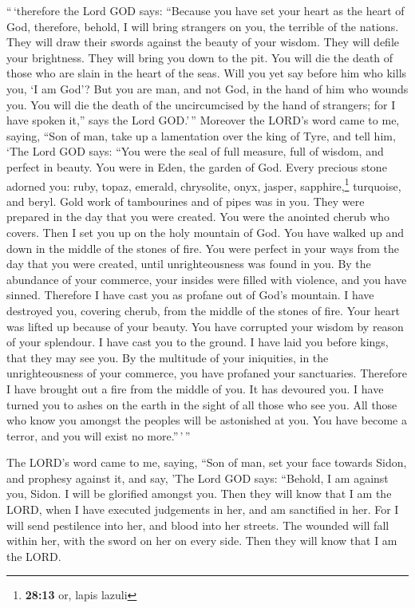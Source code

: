 ``\,`therefore the Lord GOD says: ``Because you have set
your heart as the heart of God,  therefore, behold, I will
bring strangers on you, the terrible of the nations. They will draw
their swords against the beauty of your wisdom. They will defile your
brightness.  They will bring you down to the pit. You will
die the death of those who are slain in the heart of the seas.
 Will you yet say before him who kills you, `I am God'?
But you are man, and not God, in the hand of him who wounds you.
 You will die the death of the uncircumcised by the hand
of strangers; for I have spoken it,'' says the Lord GOD.'\,''
 Moreover the LORD's word came to me, saying,
 ``Son of man, take up a lamentation over the king of
Tyre, and tell him, `The Lord GOD says: ``You were the seal of full
measure, full of wisdom, and perfect in beauty.  You were
in Eden, the garden of God. Every precious stone adorned you: ruby,
topaz, emerald, chrysolite, onyx, jasper, sapphire,\footnote{\textbf{28:13}
  or, lapis lazuli} turquoise, and beryl. Gold work of tambourines and
of pipes was in you. They were prepared in the day that you were
created.  You were the anointed cherub who covers. Then I
set you up on the holy mountain of God. You have walked up and down in
the middle of the stones of fire.  You were perfect in
your ways from the day that you were created, until unrighteousness was
found in you.  By the abundance of your commerce, your
insides were filled with violence, and you have sinned. Therefore I have
cast you as profane out of God's mountain. I have destroyed you,
covering cherub, from the middle of the stones of fire. 
Your heart was lifted up because of your beauty. You have corrupted your
wisdom by reason of your splendour. I have cast you to the ground. I
have laid you before kings, that they may see you.  By
the multitude of your iniquities, in the unrighteousness of your
commerce, you have profaned your sanctuaries. Therefore I have brought
out a fire from the middle of you. It has devoured you. I have turned
you to ashes on the earth in the sight of all those who see you.
 All those who know you amongst the peoples will be
astonished at you. You have become a terror, and you will exist no
more.''\,'\,''

 The LORD's word came to me, saying, 
``Son of man, set your face towards Sidon, and prophesy against it,
 and say, 'The Lord GOD says: ``Behold, I am against you,
Sidon. I will be glorified amongst you. Then they will know that I am
the LORD, when I have executed judgements in her, and am sanctified in
her.  For I will send pestilence into her, and blood into
her streets. The wounded will fall within her, with the sword on her on
every side. Then they will know that I am the LORD.

